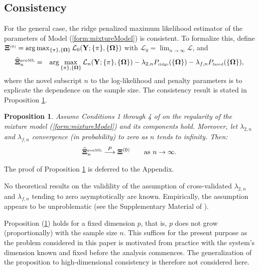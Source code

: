 \documentclass[10pt]{article}
\newtheorem{proposition}{Proposition}
\newcounter{proof}\newcounter{currproofctr}\newcounter{endproofctr}%
\begin{document}
\subsection{Consistency}\label{sec:consistency}
For the general case, the ridge penalized maximum likelihood estimator of the parameters of Model (\ref{form:mixtureModel}) is consistent. To formalize this, define
$\mathbf{\Xi}^{\mbox{{\tiny (0)}}}  = \arg \max_{\{\pi \}, \{\mathbf{\Omega} \}} \mathcal{L}_0(\mathbf{Y}; \{\pi \}, \{\mathbf{\Omega} \} )$ with $\mathcal{L}_0 = \lim_{n\rightarrow \infty} \mathcal{L}$, and
\begin{eqnarray*}
\widehat{\mathbf{\Xi}}_n^{\mbox{{\tiny penML}}} & = & \arg \max_{\{\pi \}, \{\mathbf{\Omega} \}} \mathcal{L}_n(\mathbf{Y}; \{\pi \}, \{\mathbf{\Omega} \} ) - \lambda_{2,n} P_{\mbox{{\tiny ridge}}}( \{\mathbf{\Omega} \}) - \lambda_{f,n} P_{\mbox{{\tiny fused}}}( \{\mathbf{\Omega} \}),
\end{eqnarray*}
where the novel subscript $n$ to the log-likelihood and penalty parameters is to explicate the dependence on the sample size. %
The consistency result is stated in Proposition \ref{prop.consistency}.
\begin{proposition} \label{prop.consistency}
Assume Conditions 1 through 4 of \cite{Redn1984} on the regularity of the mixture model (\ref{form:mixtureModel}) and its components hold. Moreover, let $\lambda_{2,n}$ and $\lambda_{f,n}$ convergence (in probability) to zero as $n$ tends to infinity. Then:
\begin{eqnarray*}
\widehat{\mathbf{\Xi}}^{\mbox{{\tiny penML}}}_n \stackrel{P}{\longrightarrow} \mathbf{\Xi}^{(0)} \qquad \mbox{as } n \rightarrow \infty.
\end{eqnarray*}
\end{proposition}
The proof of Proposition \ref{prop.consistency} is deferred to the Appendix.

No theoretical results on the validility of the assumption of cross-validated $\lambda_{2,n}$ and $\lambda_{f,n}$ tending to zero asymptotically are known. Empirically, the assumption appears to be unproblematic (see the Supplementary Material of \cite{VWie2016a}).

Proposition (\ref{prop.consistency}) holds for a fixed dimension $p$, that is, $p$ does not grow (proportionally) with the sample size $n$. This suffices for the present purpose as the problem considered in this paper is motivated from practice with the system's dimension known and fixed before the analysis commences. The generalization of the proposition to high-dimensional consistency is therefore not considered here.
\end{document}
